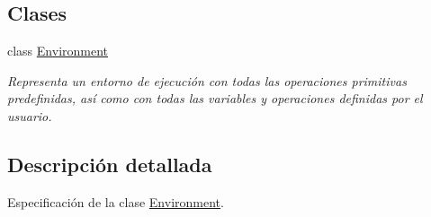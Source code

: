 \subsection*{Clases}
\begin{DoxyCompactItemize}
\item 
class \hyperlink{class_environment}{Environment}
\begin{DoxyCompactList}\small\item\em Representa un entorno de ejecución con todas las operaciones primitivas predefinidas, así como con todas las variables y operaciones definidas por el usuario. \end{DoxyCompactList}\end{DoxyCompactItemize}


\subsection{Descripción detallada}
Especificación de la clase \hyperlink{class_environment}{Environment}. 


